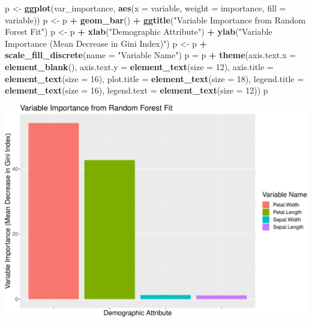 \documentclass[ignorenonframetext,]{beamer}
\newenvironment{Shaded}{\begin{snugshade}}{\end{snugshade}}
\newcommand{\KeywordTok}[1]{\textcolor[rgb]{0.13,0.29,0.53}{\textbf{#1}}}
\newcommand{\DataTypeTok}[1]{\textcolor[rgb]{0.13,0.29,0.53}{#1}}
\newcommand{\DecValTok}[1]{\textcolor[rgb]{0.00,0.00,0.81}{#1}}
\newcommand{\StringTok}[1]{\textcolor[rgb]{0.31,0.60,0.02}{#1}}
\newcommand{\OperatorTok}[1]{\textcolor[rgb]{0.81,0.36,0.00}{\textbf{#1}}}
\newcommand{\NormalTok}[1]{#1}
\begin{document}
\begin{frame}[fragile]
\begin{Shaded}
\begin{Highlighting}[]
\NormalTok{p <-}\StringTok{ }\KeywordTok{ggplot}\NormalTok{(var_importance, }\KeywordTok{aes}\NormalTok{(}\DataTypeTok{x =}\NormalTok{ variable, }\DataTypeTok{weight =}\NormalTok{ importance, }\DataTypeTok{fill =}\NormalTok{ variable))}
\NormalTok{p <-}\StringTok{ }\NormalTok{p }\OperatorTok{+}\StringTok{ }\KeywordTok{geom_bar}\NormalTok{() }\OperatorTok{+}\StringTok{ }\KeywordTok{ggtitle}\NormalTok{(}\StringTok{"Variable Importance from Random Forest Fit"}\NormalTok{)}
\NormalTok{p <-}\StringTok{ }\NormalTok{p }\OperatorTok{+}\StringTok{ }\KeywordTok{xlab}\NormalTok{(}\StringTok{"Demographic Attribute"}\NormalTok{) }\OperatorTok{+}\StringTok{ }\KeywordTok{ylab}\NormalTok{(}\StringTok{"Variable Importance (Mean Decrease in Gini Index)"}\NormalTok{)}
\NormalTok{p <-}\StringTok{ }\NormalTok{p }\OperatorTok{+}\StringTok{ }\KeywordTok{scale_fill_discrete}\NormalTok{(}\DataTypeTok{name =} \StringTok{"Variable Name"}\NormalTok{)}
\NormalTok{p =}\StringTok{ }\NormalTok{p }\OperatorTok{+}\StringTok{ }\KeywordTok{theme}\NormalTok{(}\DataTypeTok{axis.text.x =} \KeywordTok{element_blank}\NormalTok{(), }\DataTypeTok{axis.text.y =} \KeywordTok{element_text}\NormalTok{(}\DataTypeTok{size =} \DecValTok{12}\NormalTok{), }
    \DataTypeTok{axis.title =} \KeywordTok{element_text}\NormalTok{(}\DataTypeTok{size =} \DecValTok{16}\NormalTok{), }\DataTypeTok{plot.title =} \KeywordTok{element_text}\NormalTok{(}\DataTypeTok{size =} \DecValTok{18}\NormalTok{), }
    \DataTypeTok{legend.title =} \KeywordTok{element_text}\NormalTok{(}\DataTypeTok{size =} \DecValTok{16}\NormalTok{), }\DataTypeTok{legend.text =} \KeywordTok{element_text}\NormalTok{(}\DataTypeTok{size =} \DecValTok{12}\NormalTok{))}
\NormalTok{p}
\end{Highlighting}
\end{Shaded}

\includegraphics{8TreesBEAMER_files/figure-beamer/unnamed-chunk-36-1.pdf}

\end{frame}
\end{document}
